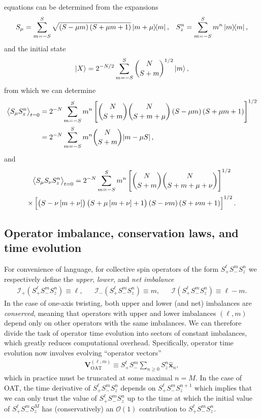 \documentclass[aps,notitlepage,nofootinbib,11pt]{revtex4-1}
\renewcommand{\t}{\text} %
\newcommand{\p}[1]{\left(#1\right)} %
\renewcommand{\sp}[1]{\left[#1\right]} %
\renewcommand{\v}{\bm} %
\newcommand{\uv}[1]{\v{\hat{#1}}} %
\newcommand{\bk}{\Braket} %
\newcommand{\I}{\mathcal{I}}
\renewcommand{\O}{\mathcal{O}}
\newcommand{\1}{\mathds{1}}
\begin{document}
equations can be determined from the expansions
\begin{align}
  S_\mu = \sum_{m=-S}^S \sqrt{\p{S-\mu m}\p{S+\mu m+1}} \op{m+\mu}{m},
  &&
  S_z^n = \sum_{m=-S}^S m^n \op{m},
\end{align}
and the initial state
\begin{align}
  \ket{X} = 2^{-N/2} \sum_{m=-S}^S { N \choose S+m }^{1/2} \ket{m},
\end{align}
from which we can determine
\begin{align}
  \bk{S_\mu S_z^n}_{t=0}
  &= 2^{-N} \sum_{m=-S}^S m^n
  \sp{{ N \choose S+m } { N \choose S+m+\mu }
    \p{S-\mu m}\p{S+\mu m+1}}^{1/2} \\
  &= 2^{-N} \sum_{m=-S}^S m^n { N \choose S+m } \abs{m - \mu S},
\end{align}
and
\begin{multline}
  \bk{S_\mu S_\nu S_z^n}_{t=0}
  = 2^{-N} \sum_{m=-S}^S m^n
  \sp{{ N \choose S+m } { N \choose S+m+\mu+\nu }}^{1/2} \\
  \times \sp{\p{S-\nu\sp{m+\nu}}\p{S+\mu\sp{m+\nu}+1}
    \p{S-\nu m}\p{S+\nu m+1}}^{1/2}.
\end{multline}

\subsection{Operator imbalance, conservation laws, and time evolution}

For convenience of language, for collective spin operators of the form
$S_+^\ell S_-^m S_z^n$ we respectively define the {\it upper}, {\it
  lower}, and {\it net imbalance}
\begin{align}
  \I_+\p{S_+^\ell S_-^m S_z^n} \equiv \ell,
  &&
  \I_-\p{S_+^\ell S_-^m S_z^n} \equiv m,
  &&
  \I\p{S_+^\ell S_-^m S_z^n} \equiv \ell - m.
\end{align}
In the case of one-axis twisting, both upper and lower (and net)
imbalances are {\it conserved}, meaning that operators with upper and
lower imbalances $\p{\ell,m}$ depend only on other operators with the
same imbalances.  We can therefore divide the task of operator time
evolution into sectors of constant imbalances, which greatly reduces
computational overhead.  Specifically, operator time evolution now
involves evolving ``operator vectors''
\begin{align}
  \v V_{\t{OAT}}^{(\ell,m)}
  \equiv S_+^\ell S_-^m \sum_{n\ge0} S_z^n \uv x_n,
\end{align}
which in practice must be truncated at some maximal $n=M$.  In the
case of OAT, the time derivative of $S_+^\ell S_-^m S_z^n$ depends on
$S_+^\ell S_-^m S_z^{n+1}$ which implies that we can only trust the
value of $S_+^\ell S_-^m S_z^n$ up to the time at which the initial
value of $S_+^\ell S_-^m S_z^M$ has (conservatively) an $\O\p{1}$
contribution to $S_+^\ell S_-^m S_z^n$.
\end{document}
